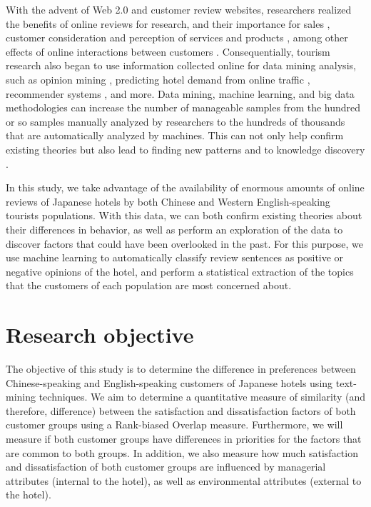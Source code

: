 With the advent of Web 2.0 and customer review websites, researchers realized the benefits of online reviews for research, and their importance for sales  \cite[][]{ye2009, basuroy2003}, customer consideration \cite[][]{vermeulen2009} and perception of services and products \cite[][]{browning2013}, among other effects of online interactions between customers \cite[e.g.][]{xiang2010, ren2019}. Consequentially, tourism research also began to use information collected online for data mining analysis, such as opinion mining \cite[e.g.][]{hu2017436}, predicting hotel demand from online traffic \cite[][]{yang2014}, recommender systems \cite[e.g.][]{loh2003}, and more. Data mining, machine learning, and big data methodologies can increase the number of manageable samples from the hundred or so samples manually analyzed by researchers to the hundreds of thousands that are automatically analyzed by machines. This can not only help confirm existing theories but also lead to finding new patterns and to knowledge discovery \cite[][]{fayyad1996data}. 

In this study, we take advantage of the availability of enormous amounts of online reviews of Japanese hotels by both Chinese and Western English-speaking tourists populations. With this data, we can both confirm existing theories about their differences in behavior, as well as perform an exploration of the data to discover factors that could have been overlooked in the past. For this purpose, we use machine learning to automatically classify review sentences as positive or negative opinions of the hotel, and perform a statistical extraction of the topics that the customers of each population are most concerned about.


\section{Research objective}\label{research_objective}

The objective of this study is to determine the difference in preferences between Chinese-speaking and English-speaking customers of Japanese hotels using text-mining techniques. We aim to determine a quantitative measure of similarity (and therefore, difference) between the satisfaction and dissatisfaction factors of both customer groups using a Rank-biased Overlap measure. Furthermore, we will measure if both customer groups have differences in priorities for the factors that are common to both groups. In addition, we also measure how much satisfaction and dissatisfaction of both customer groups are influenced by managerial attributes (internal to the hotel), as well as environmental attributes (external to the hotel). 

